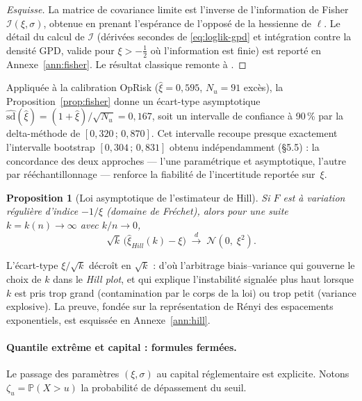 \documentclass[11pt,a4paper]{article}
\theoremstyle{navystyle}
\newtheorem{proposition}[theorem]{Proposition}
\theoremstyle{navydef}
\newcommand{\Prob}{\mathbb{P}}
\begin{document}
\begin{proof}[Esquisse]
La matrice de covariance limite est l'inverse de l'information de Fisher $\mathcal{I}(\xi,\sigma)$, obtenue en prenant l'espérance de l'opposé de la hessienne de $\ell$. Le détail du calcul de $\mathcal{I}$ (dérivées secondes de \eqref{eq:loglik-gpd} et intégration contre la densité GPD, valide pour $\xi>-\tfrac12$ où l'information est finie) est reporté en Annexe~\ref{ann:fisher}. Le résultat classique remonte à \citet{smith1987}.
\end{proof}

\noindent Appliquée à la calibration OpRisk ($\hat\xi=0{,}595$, $N_u=91$ excès), la Proposition~\ref{prop:fisher} donne un écart-type asymptotique $\widehat{\mathrm{sd}}(\hat\xi)=(1+\hat\xi)/\sqrt{N_u}=0{,}167$, soit un intervalle de confiance à 90\,\% par la delta-méthode de $[0{,}320\,;\,0{,}870]$. Cet intervalle recoupe presque exactement l'intervalle bootstrap $[0{,}304\,;\,0{,}831]$ obtenu indépendamment (§5.5) : la concordance des deux approches --- l'une paramétrique et asymptotique, l'autre par rééchantillonnage --- renforce la fiabilité de l'incertitude reportée sur~$\xi$.

\begin{proposition}[Loi asymptotique de l'estimateur de Hill]\label{prop:hill}
Si $F$ est à variation régulière d'indice $-1/\xi$ (domaine de Fréchet), alors pour une suite $k=k(n)\to\infty$ avec $k/n\to0$,
\begin{equation}
\sqrt{k}\,\bigl(\hat\xi_{Hill}(k)-\xi\bigr)\;\xrightarrow{\;d\;}\;\mathcal{N}(0,\;\xi^2).
\end{equation}
\end{proposition}

\noindent L'écart-type $\xi/\sqrt{k}$ décroît en $\sqrt{k}$ : d'où l'arbitrage biais--variance qui gouverne le choix de $k$ dans le \emph{Hill plot}, et qui explique l'instabilité signalée plus haut lorsque $k$ est pris trop grand (contamination par le corps de la loi) ou trop petit (variance explosive). La preuve, fondée sur la représentation de Rényi des espacements exponentiels, est esquissée en Annexe~\ref{ann:hill}.

\paragraph{Quantile extrême et capital : formules fermées.} Le passage des paramètres $(\xi,\sigma)$ au capital réglementaire est explicite. Notons $\zeta_u=\Prob(X>u)$ la probabilité de dépassement du seuil.
\end{document}
